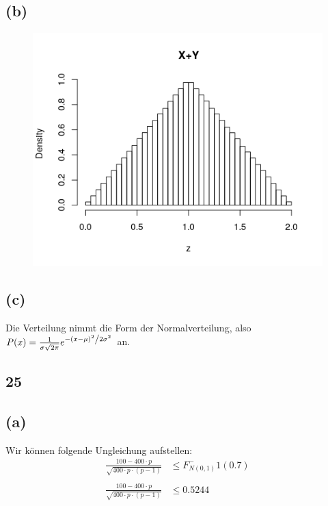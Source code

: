 \documentclass[a4paper]{scrartcl}
\begin{document}
\subsection*{(b)}
\begin{figure}[H]
	  \includegraphics{Rplot01.png}
\end{figure}

\subsection*{(c)}
Die Verteilung nimmt die Form der Normalverteilung, also $P(x) = \frac{1}{{\sigma \sqrt {2\pi } }}e^{{{ - \left( {x - \mu } \right)^2 } \mathord{\left/ {\vphantom {{ - \left( {x - \mu } \right)^2 } {2\sigma ^2 }}} \right. \kern-\nulldelimiterspace} {2\sigma ^2 }}}$ an.






\subsection*{25}
\subsection*{(a)}
Wir können folgende Ungleichung aufstellen:\\

\begin{align*}
	\frac{100-400\cdot p}{\sqrt{400 \cdot p \cdot (p-1)}} &\leq F_{N(0,1)}^-1(0.7)\\\\
	\frac{100-400\cdot p}{\sqrt{400 \cdot p \cdot (p-1)}} &\leq 0.5244
\end{align*}
\end{document}
